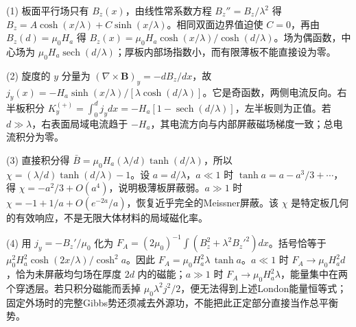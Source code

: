 (1) 板面平行场只有 \(B_z(x)\)，由线性常系数方程 \(B_z''=B_z/\lambda^2\) 得 \(B_z=A\cosh(x/\lambda)+C\sinh(x/\lambda)\)。相同双面边界值迫使 \(C=0\)，再由 \(B_z(d)=\mu_0H_a\) 得 \(\boxed{B_z(x)=\mu_0H_a\cosh(x/\lambda)/\cosh(d/\lambda)}\)。场为偶函数，中心场为 \(\mu_0H_a\operatorname{sech}(d/\lambda)\)；厚板内部场指数小，而有限薄板不能直接设为零。

(2) 旋度的 \(y\) 分量为 \((\nabla\times\mathbf B)_y=-dB_z/dx\)，故 \(j_y(x)=-H_a\sinh(x/\lambda)/[\lambda\cosh(d/\lambda)]\)。它是奇函数，两侧电流反向。右半板积分 \(K_y^{(+)}=\int_0^d j_y dx=-H_a[1-\operatorname{sech}(d/\lambda)]\)，左半板则为正值。若 \(d\gg\lambda\)，右表面局域电流趋于 \(-H_a\)，其电流方向与内部屏蔽磁场梯度一致；总电流积分为零。

(3) 直接积分得 \(\bar B=\mu_0H_a(\lambda/d)\tanh(d/\lambda)\)，所以 \(\boxed{\chi=(\lambda/d)\tanh(d/\lambda)-1}\)。设 \(a=d/\lambda\)，\(a\ll1\) 时 \(\tanh a=a-a^3/3+\cdots\)，得 \(\chi=-a^2/3+O(a^4)\)，说明极薄板屏蔽弱。\(a\gg1\) 时 \(\chi=-1+1/a+O(e^{-2a}/a)\)，恢复近乎完全的Meissner屏蔽。该 \(\chi\) 是特定板几何的有效响应，不是无限大体材料的局域磁化率。

(4) 用 \(j_y=-B_z'/\mu_0\) 化为 \(F_A=(2\mu_0)^{-1}\int(B_z^2+\lambda^2B_z'^2)dx\)。括号恰等于 \(\mu_0^2H_a^2\cosh(2x/\lambda)/\cosh^2a\)。因此 \(F_A=\mu_0H_a^2\lambda\,\tanh a\)。\(a\ll1\) 时 \(F_A\to\mu_0H_a^2d\)，恰为未屏蔽均匀场在厚度 \(2d\) 内的磁能；\(a\gg1\) 时 \(F_A\to\mu_0H_a^2\lambda\)，能量集中在两个穿透层。若只积分磁能而丢掉 \(\mu_0\lambda^2j^2/2\)，便无法得到上述London能量恒等式；固定外场时的完整Gibbs势还须减去外源功，不能把此正定部分直接当作总平衡势。
